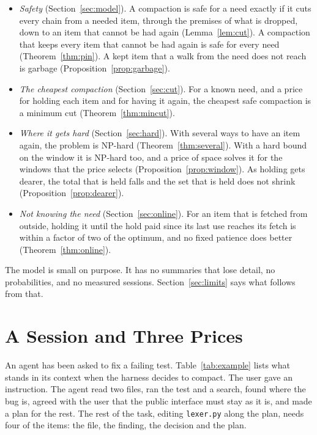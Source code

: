 \documentclass[acmsmall,nonacm,screen]{acmart}
\newcommand{\str}[1]{\texttt{#1}}
\begin{document}
\begin{itemize}
\item \emph{Safety} (Section~\ref{sec:model}). A compaction is safe for a need exactly if it
  cuts every chain from a needed item, through the premises of what is dropped, down to an
  item that cannot be had again (Lemma~\ref{lem:cut}). A compaction that keeps every item
  that cannot be had again is safe for every need (Theorem~\ref{thm:pin}). A kept item that a
  walk from the need does not reach is garbage (Proposition~\ref{prop:garbage}).
\item \emph{The cheapest compaction} (Section~\ref{sec:cut}). For a known need, and a price
  for holding each item and for having it again, the cheapest safe compaction is a minimum
  cut (Theorem~\ref{thm:mincut}).
\item \emph{Where it gets hard} (Section~\ref{sec:hard}). With several ways to have an item
  again, the problem is NP-hard (Theorem~\ref{thm:several}). With a hard bound on the window
  it is NP-hard too, and a price of space solves it for the windows that the price selects
  (Proposition~\ref{prop:window}). As holding gets dearer, the total that is held falls and
  the set that is held does not shrink (Proposition~\ref{prop:dearer}).
\item \emph{Not knowing the need} (Section~\ref{sec:online}). For an item that is fetched
  from outside, holding it until the hold paid since its last use reaches its fetch is within
  a factor of two of the optimum, and no fixed patience does better
  (Theorem~\ref{thm:online}).
\end{itemize}

The model is small on purpose. It has no summaries that lose detail, no probabilities, and
no measured sessions. Section~\ref{sec:limits} says what follows from that.

\section{A Session and Three Prices}\label{sec:example}

An agent has been asked to fix a failing test. Table~\ref{tab:example} lists what stands in
its context when the harness decides to compact. The user gave an instruction. The agent
read two files, ran the test and a search, found where the bug is, agreed with the user that
the public interface must stay as it is, and made a plan for the rest. The rest of the task,
editing \str{lexer.py} along the plan, needs four of the items: the file, the finding, the
decision and the plan.
\end{document}
